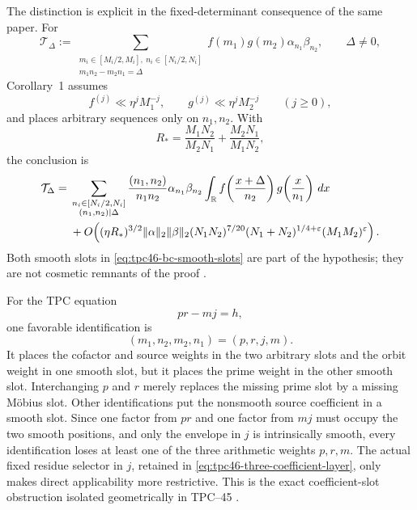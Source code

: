 The distinction is explicit in the fixed-determinant consequence of the
same paper.  For
\begin{equation}
 \mathcal T_\Delta
 :=
 \sum_{\substack{m_i\in[M_i/2,M_i],\ n_i\in[N_i/2,N_i]\\
                   m_1n_2-m_2n_1=\Delta}}
 f(m_1)g(m_2)\alpha_{n_1}\beta_{n_2},
 \qquad \Delta\ne0,
 \label{eq:tpc46-bc-determinant}
\end{equation}
Corollary~1 assumes
\begin{equation}
 f^{(j)}\ll \eta^jM_1^{-j},
 \qquad
 g^{(j)}\ll \eta^jM_2^{-j}
 \qquad (j\ge0),
 \label{eq:tpc46-bc-smooth-slots}
\end{equation}
and places arbitrary sequences only on \(n_1,n_2\).  With
\begin{equation}
 R_*=\frac{M_1N_2}{M_2N_1}+\frac{M_2N_1}{M_1N_2},
 \label{eq:tpc46-bc-rstar}
\end{equation}
the conclusion is
\begin{align}
 \mathcal T_\Delta
 ={}&
 \sum_{\substack{n_i\in[N_i/2,N_i]\\(n_1,n_2)\mid\Delta}}
 \frac{(n_1,n_2)}{n_1n_2}\alpha_{n_1}\beta_{n_2}
 \int_{\mathbb R}
 f\!\left(\frac{x+\Delta}{n_2}\right)
 g\!\left(\frac{x}{n_1}\right)\,dx
 \notag\\
 &+O\!\left(
 (\eta R_*)^{3/2}\|\alpha\|_2\|\beta\|_2
 (N_1N_2)^{7/20}(N_1+N_2)^{1/4+\varepsilon}
 (M_1M_2)^\varepsilon
 \right).
 \label{eq:tpc46-bc-corollary}
\end{align}
Both smooth slots in \eqref{eq:tpc46-bc-smooth-slots} are part of the
hypothesis; they are not cosmetic remnants of the proof
\citep[Corollary~1]{BC2018}.

For the TPC equation
\begin{equation}
 pr-mj=h,
 \label{eq:tpc46-tpc-determinant-literature}
\end{equation}
one favorable identification is
\begin{equation}
 (m_1,n_2,m_2,n_1)=(p,r,j,m).
 \label{eq:tpc46-bc-slot-identification}
\end{equation}
It places the cofactor and source weights in the two arbitrary slots and
the orbit weight in one smooth slot, but it places the prime weight in
the other smooth slot.  Interchanging \(p\) and \(r\) merely replaces
the missing prime slot by a missing M\"obius slot.  Other identifications
put the nonsmooth source coefficient in a smooth slot.  Since one factor
from \(pr\) and one factor from \(mj\) must occupy the two smooth
positions, and only the envelope in \(j\) is intrinsically smooth,
every identification loses at least one of the three arithmetic
weights \(p,r,m\).  The actual fixed residue selector in \(j\), retained
in \cref{eq:tpc46-three-coefficient-layer}, only makes direct
applicability more restrictive.  This is
the exact coefficient-slot obstruction isolated geometrically in
TPC--45 \citep{WangTPC45}.

